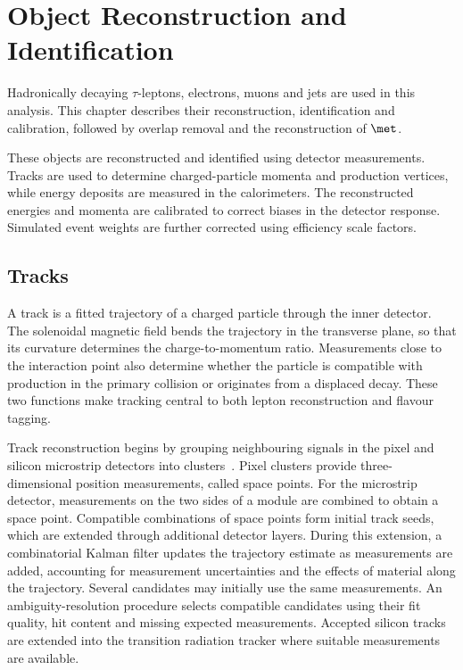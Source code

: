 \chapter{Object Reconstruction and Identification}
\label{chapter:object_reconstruction}

Hadronically decaying $\tau$-leptons, electrons, muons and jets are used in this analysis.
This chapter describes their reconstruction, identification and calibration, followed by overlap removal and the reconstruction of $\met$.

These objects are reconstructed and identified using detector measurements.
Tracks are used to determine charged-particle momenta and production vertices, while energy deposits are measured in the calorimeters.
The reconstructed energies and momenta are calibrated to correct biases in the detector response.
Simulated event weights are further corrected using efficiency scale factors.


\section{Tracks}
\label{sec:ch6_tracks}

A track is a fitted trajectory of a charged particle through the inner detector.
The solenoidal magnetic field bends the trajectory in the transverse plane, so that its curvature determines the charge-to-momentum ratio.
Measurements close to the interaction point also determine whether the particle is compatible with production in the primary collision or originates from a displaced decay.
These two functions make tracking central to both lepton reconstruction and flavour tagging.

Track reconstruction begins by grouping neighbouring signals in the pixel and silicon microstrip detectors into clusters~\cite{ATLAS2017DenseTracking}.
Pixel clusters provide three-dimensional position measurements, called space points.
For the microstrip detector, measurements on the two sides of a module are combined to obtain a space point.
Compatible combinations of space points form initial track seeds, which are extended through additional detector layers.
During this extension, a combinatorial Kalman filter updates the trajectory estimate as measurements are added, accounting for measurement uncertainties and the effects of material along the trajectory.
Several candidates may initially use the same measurements.
An ambiguity-resolution procedure selects compatible candidates using their fit quality, hit content and missing expected measurements.
Accepted silicon tracks are extended into the transition radiation tracker where suitable measurements are available.

